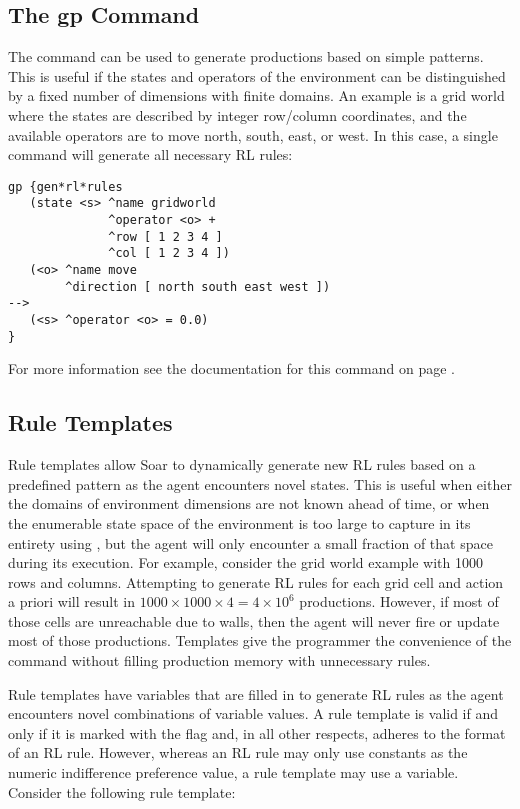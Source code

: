 \subsection{The gp Command}
The  command can be used to generate productions based on simple patterns.
This is useful if the states and operators of the environment can be distinguished by a fixed number of dimensions with finite domains.
An example is a grid world where the states are described by integer row/column coordinates, and the available operators are to move north, south, east, or west.
In this case, a single  command will generate all necessary RL rules:
	
\begin{verbatim}
gp {gen*rl*rules
   (state <s> ^name gridworld
              ^operator <o> +
              ^row [ 1 2 3 4 ]
              ^col [ 1 2 3 4 ])
   (<o> ^name move
        ^direction [ north south east west ])
-->
   (<s> ^operator <o> = 0.0)
}
\end{verbatim}
	
For more information see the documentation for this command on page \pageref{gp}.

\subsection{Rule Templates}
\label{RL-templates}

Rule templates allow Soar to dynamically generate new RL rules based on a predefined pattern as the agent encounters novel states.
This is useful when either the domains of environment dimensions are not known ahead of time, or when the enumerable state space of the environment is too large to capture in its entirety using , but the agent will only encounter a small fraction of that space during its execution.
For example, consider the grid world example with 1000 rows and columns.
Attempting to generate RL rules for each grid cell and action a priori will result in $1000 \times 1000 \times 4 = 4 \times 10^6$ productions.
However, if most of those cells are unreachable due to walls, then the agent will never fire or update most of those productions.
Templates give the programmer the convenience of the  command without filling production memory with unnecessary rules.

Rule templates have variables that are filled in to generate RL rules as the agent encounters novel combinations of variable values.
A rule template is valid if and only if it is marked with the  flag and, in all other respects, adheres to the format of an RL rule.
However, whereas an RL rule may only use constants as the numeric indifference preference value, a rule template may use a variable.
Consider the following rule template:

